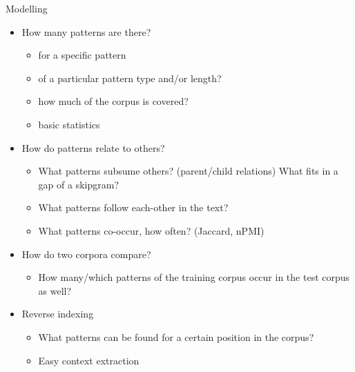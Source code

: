 \documentclass[compress]{beamer}
\begin{document}
\begin{frame}
  \begin{block}{Modelling}
    \begin{itemize}
      \item How many patterns are there?
      \begin{itemize}
        \item for a specific pattern
        \item of a particular pattern type and/or length?
        \item how much of the corpus is covered?
        \item basic statistics
      \end{itemize}
      \item How do patterns relate to others?
      \begin{itemize}
        \item What patterns subsume others? (parent/child relations)  What fits
          in a gap of a skipgram?
        \item What patterns follow each-other in the text? 
        \item What patterns co-occur, how often? (Jaccard, nPMI) 
      \end{itemize}
      \item How do two corpora compare?
      \begin{itemize}
        \item How many/which patterns of the training corpus occur in the
          test corpus as well?
      \end{itemize}
      \item Reverse indexing
      \begin{itemize}
          \item What patterns can be found for a certain position in the corpus?
          \item Easy context extraction
      \end{itemize}
    \end{itemize}
  \end{block}
\end{frame}
\end{document}
